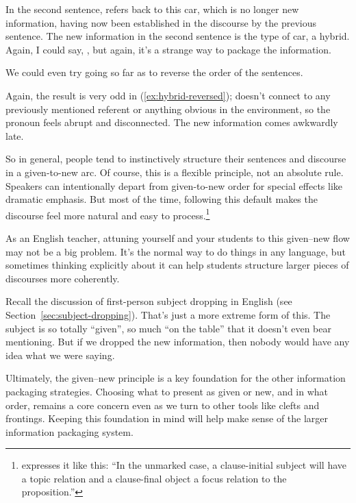 In the second sentence,  refers back to this car, which is no longer new information, having now been established in the discourse by the previous sentence. The new information in the second sentence is the type of car, a hybrid. Again, I could say, , but again, it's a strange way to package the information.

We could even try going so far as to reverse the order of the sentences.

\label{ex:hybrid-reversed}
\z
Again, the result is very odd in (\ref{ex:hybrid-reversed});  doesn't connect to any previously mentioned referent or anything obvious in the environment, so the pronoun feels abrupt and disconnected. The new information  comes awkwardly late.

So in general, people tend to instinctively structure their sentences and discourse in a given-to-new arc. Of course, this is a flexible principle, not an absolute rule. Speakers can intentionally depart from given-to-new order for special effects like dramatic emphasis. But most of the time, following this default makes the discourse feel more natural and easy to process.\footnote{\citet[16]{Lambrecht1994} expresses it like this: \enquote{In the unmarked case, a clause-initial subject will have a topic relation and a clause-final object a focus relation to the proposition.}}

As an English teacher, attuning yourself and your students to this given--new flow may not be a big problem. It's the normal way to do things in any language, but sometimes thinking explicitly about it can help students structure larger pieces of discourses more coherently.

Recall the discussion of first-person subject dropping in English (see Section~\ref{sec:subject-dropping}). That's just a more extreme form of this. The subject  is so totally \enquote{given}, so much \enquote{on the table} that it doesn't even bear mentioning. But if we dropped the new information, then nobody would have any idea what we were saying.

Ultimately, the given--new principle is a key foundation for the other information packaging strategies. Choosing what to present as given or new, and in what order, remains a core concern even as we turn to other tools like clefts and frontings. Keeping this foundation in mind will help make sense of the larger information packaging system.

